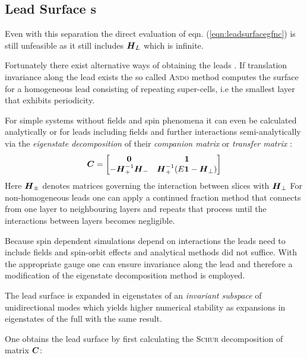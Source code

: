 \subsection{Lead Surface \cgfnc s}
Even with this separation the direct evaluation of eqn. (\ref{eqn:leadsurfacegfnc}) is still unfeasible as it still includes $\boldsymbol{H}_L$ which is infinite.\par Fortunately there exist alternative ways of obtaining the leads \gfnc{}.
If translation invariance along the lead exists the so called \textsc{Ando} method \cite{PhysRevB.44.8017} computes the surface \gfnc{} for a homogeneous lead consisting of repeating super-cells, i.e the smallest layer that exhibits periodicity.\par
For simple systems without fields and spin phenomena it can even be calculated analytically \cite{Datta1997} or for leads including fields and further interactions semi-analytically via the \emph{eigenstate decomposition} of their \emph{companion matrix} or \emph{transfer matrix} \cite{PhysRevB.55.5266} \cite{PhysRevB.66.205319}:
\begin{align}
  \boldsymbol{C} =
  \begin{bmatrix}
  \boldsymbol{0}  &\boldsymbol{1} \\
  -\boldsymbol{H}_{+}^{-1}\boldsymbol{H}_{-} &\boldsymbol{H}_{+}^{-1} (E\boldsymbol{1} - \boldsymbol{H}_{\perp})
  \end{bmatrix}
  \label{eqn:greendivided}
\end{align}
Here $\boldsymbol{H}_{\pm}$ denotes matrices governing the interaction between slices with \hamil{} $\boldsymbol{H}_{\perp}$
For non-homogeneous leads one can apply a continued fraction method \cite{Velev2004} that connects \gfnc{} from one layer to neighbouring layers and repeats that process until the interactions between layers becomes negligible.\par
Because spin dependent simulations depend on interactions the leads need to include fields and spin-orbit effects and analytical methods did not suffice. With the appropriate gauge one can ensure invariance along the lead and therefore a modification of the eigenstate decomposition method is employed.\par
The lead surface \gfnc{} is expanded in eigenstates of an \emph{invariant subspace} of unidirectional modes which yields higher numerical stability as expansions in eigenstates of the full \hamil{} with the same result\cite{Wimmer2009JComPhys}.\par
One obtains the lead surface \gfnc{} by first calculating the \textsc{Schur} decomposition of matrix $\boldsymbol{C}$:
